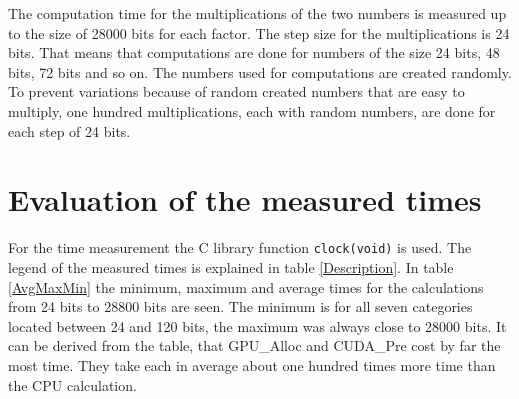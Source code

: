 \documentclass[12pt,a4paper]{article}
\begin{document}
The computation time for the multiplications of the two numbers is measured up to the size of 28000 bits for each factor. The step size for the multiplications is 24 bits. That means that computations are done for numbers of the size 24 bits, 48 bits, 72 bits and so on. The numbers used for computations are created randomly. To prevent variations because of random created numbers that are easy to multiply, one hundred multiplications, each with random numbers, are done for each step of 24 bits.

\section{Evaluation of the measured times}
For the time measurement the C library function \texttt{clock(void)} is used. The legend of the measured times is explained in table \ref{Description}. In table \ref{AvgMaxMin} the minimum, maximum and average times for the calculations from 24 bits to 28800 bits are seen. The minimum is for all seven categories located between 24 and 120 bits, the maximum was always close to 28000 bits. It can be derived from the table, that GPU\_Alloc and CUDA\_Pre cost by far the most time. They take each in average about one hundred times more time than the CPU calculation.
\end{document}
